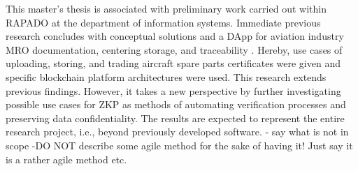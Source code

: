 This master's thesis is associated with preliminary work carried out within RAPADO at the department of information systems. Immediate previous research concludes with conceptual solutions and a DApp for aviation industry MRO documentation, centering storage, and traceability \citep{ZedelJ, semesterproject}. Hereby, use cases of uploading, storing, and trading aircraft spare parts certificates were given and specific blockchain platform architectures were used. This research extends previous findings. However, it takes a new perspective by further investigating possible use cases for ZKP as methods of automating verification processes and preserving data confidentiality. The results are expected to represent the entire research project, i.e., beyond previously developed software.
- say what is not in scope
-DO NOT describe some agile method for the sake of having it! Just say it is a rather agile method etc.
\begin{comment}
I. Systematic literature review according to vom Brocke, Cooper and Webster: 
    1. Definition of Scope
        - classification, examples, challenges and evaluation methods of zero knowledge proof protocols 
        
    2. Conceptualization
        - work with concept map
        - derive at a search string
        
    3. Literature Search and Selection
        - look for review paper first to get good overview about the topic
        a) exclude paper that are too old and have too few citations and/or low impact factor (e.g. 5.5 is high)
        b) exclusion acc. to title and keywords
        c) exclusion acc. to abstract & structure of paper & RQ
        c) exclusion acc. to full text & availability of resource
        
    4. Synthesizing of Literature
        - cluster definitions, examples, drawbacks and evaluation methods (first suggestion can be found in the preliminary agenda)
        - write overview section about ZKP (Chapter 4)
- - - - - - -
How to know if a paper is useful for me?
1.title 2.keywords 3.abstract 4.structure of the paper 5.examples/use cases 6.research question/formal problem definition
- - - - - - -
II. Design Science Research
- DSR method acc. to Peffers and Hevner

\end{comment}
\begin{comment}
2) Ziel der Arbeit, scope of work
- not scope to practically integrate any of the concepts into existing DApp or any other existing system
- welche use cases gibt es f{"u}r ZKPs in RAPADO
- wie k{"o}nnte man diese Umsetzen

4) Ergebnisse skizzieren
- implementation can be a proof of concept, software artifact depends highly on complexity of the use case
\end{comment}